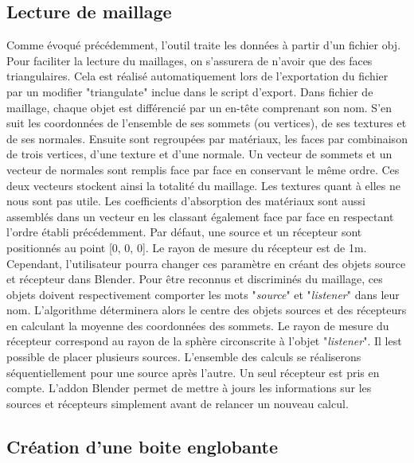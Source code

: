 \subsection{Lecture de maillage}
Comme évoqué précédemment, l'outil traite les données à partir d'un fichier \gls{obj}. Pour faciliter la lecture du maillages, on s'assurera de n'avoir que des faces triangulaires. Cela est réalisé automatiquement lors de l'exportation du fichier par un \gls{modifier} "triangulate" inclue dans le script d'export. Dans fichier de maillage, chaque objet est différencié par un en-tête comprenant son nom. S'en suit les coordonnées de l'ensemble de ses sommets (ou vertices), de ses textures et de ses normales. Ensuite sont regroupées par matériaux, les faces par combinaison de trois vertices, d'une texture et d'une normale. Un vecteur de sommets et un vecteur de normales sont remplis face par face en conservant le même ordre. Ces deux vecteurs stockent ainsi la totalité du maillage. Les textures quant à elles ne nous sont pas utile. Les coefficients d'absorption des matériaux sont aussi assemblés dans un vecteur en les classant également face par face en respectant l'ordre établi précédemment.
Par défaut, une source et un récepteur sont positionnés au point [0, 0, 0]. Le rayon de mesure du récepteur est de 1m. Cependant, l'utilisateur pourra changer ces paramètre en créant des objets source et récepteur dans Blender. Pour être reconnus et discriminés du maillage, ces objets doivent respectivement comporter les mots "\textit{source}" et "\textit{listener}" dans leur nom. L'algorithme déterminera alors le centre des objets sources et des récepteurs en calculant la moyenne des coordonnées des sommets. Le rayon de mesure du récepteur correspond au rayon de la sphère circonscrite à l'objet "\textit{listener}". Il lest possible de placer plusieurs sources. L'ensemble des calculs se réaliserons séquentiellement pour une source après l'autre. Un seul récepteur est pris en compte. L'addon Blender permet de mettre à jours les informations sur les sources et récepteurs simplement avant de relancer un nouveau calcul.



\subsection{Création d'une boite englobante}

